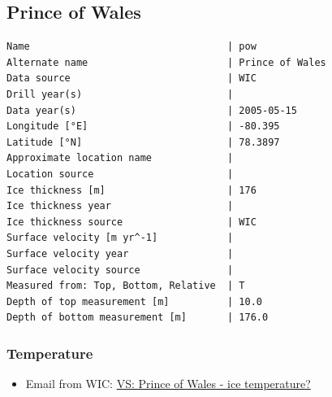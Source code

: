 \documentclass[article,a4paper,times,11pt,twoside]{article}
\begin{document}
\subsection{Prince of Wales}
\label{sec:orgbd9f34c}
\begin{verbatim}
Name                                  | pow
Alternate name                        | Prince of Wales
Data source                           | WIC
Drill year(s)                         | 
Data year(s)                          | 2005-05-15
Longitude [°E]                        | -80.395
Latitude [°N]                         | 78.3897
Approximate location name             | 
Location source                       | 
Ice thickness [m]                     | 176
Ice thickness year                    | 
Ice thickness source                  | WIC
Surface velocity [m yr^-1]            | 
Surface velocity year                 | 
Surface velocity source               | 
Measured from: Top, Bottom, Relative  | T
Depth of top measurement [m]          | 10.0
Depth of bottom measurement [m]       | 176.0
\end{verbatim}

\subsubsection{Temperature}
\label{sec:org5e4e366}

\begin{itemize}
\item Email from WIC: \href{msgid:AM0PR04MB61293648564AB69ACA6A02CBA2F30@AM0PR04MB6129.eurprd04.prod.outlook.com}{VS: Prince of Wales - ice temperature?}
\end{itemize}
\end{document}
